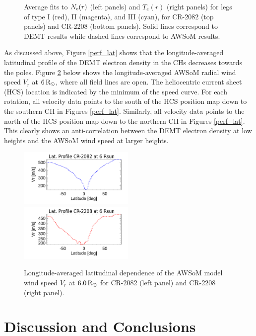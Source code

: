 \documentclass[namedreferences]{solarphysics}
\newcommand{\mrsun}{{\rm R_\odot}}
\newcommand{\Ne}{N_{\rm e}}
\begin{document}
\begin{article}
\begin{figure}[h!]
\begin{center}
\caption{{Average fits to $\Ne(r)$ (left panels) and $T_e(r)$ (right panels) for legs of {type I (red), II (magenta), and III (cyan)}, for CR-2082 (top panels) and CR-2208 (bottom panels). Solid lines correspond to DEMT results while dashed lines correspond to AWSoM results.}}
\label{perfiles_promedio}
\end{center}
\end{figure}

{As discussed above, Figure \ref{perf_lat} shows that the longitude-averaged latitudinal profile of the DEMT electron density in the CHs decreases towards the poles. Figure \ref{perf_lon_vr} below shows the longitude-averaged AWSoM radial wind speed $V_r$ at $6\,\mrsun$, where all field lines are open. The heliocentric current sheet (HCS) location is indicated by the minimum of the speed curve. For each rotation, all velocity data points to the south of the HCS position map down to the southern CH in Figures \ref{perf_lat}. Similarly, all velocity data points to the north of the HCS position map down to the northern CH in Figures \ref{perf_lat}. This clearly shows an anti-correlation between the DEMT electron density at low heights and the AWSoM wind speed at larger heights.}

\begin{figure}[h!]
\begin{center}
\includegraphics[width=0.495\textwidth]{figs/Perfil_Vr_2082_5995_2.pdf}
\includegraphics[width=0.495\textwidth]{figs/Perfil_Vr_2208_5995_2.pdf}
\caption{{Longitude-averaged latitudinal dependence of the AWSoM model {wind speed $V_r$} at $6.0\,\mrsun$ for CR-2082 (left panel) and CR-2208 (right panel).}}
\label{perf_lon_vr}
\end{center}
\end{figure}

\section{{Discussion and Conclusions}}\label{discu} 


\end{article}
\end{document}

